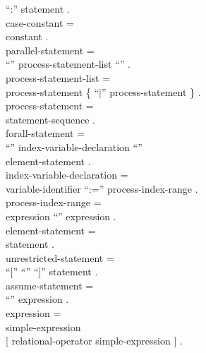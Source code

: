 \begin{grammar}
           ``:'' statement .                              \\
  {\GA}case-constant =                                    \\
    {\GB}constant .                                       \\
  {\GA}parallel-statement =                               \\
    {\GB}``{\Parallel}'' process-statement-list
           ``{\End}'' .                                   \\
  {\GA}process-statement-list =                           \\
    {\GB}process-statement
           \{ ``$|$'' process-statement \} .              \\
  {\GA}process-statement =                                \\
    {\GB}statement-sequence .                             \\
  {\GA}forall-statement =                                 \\
    {\GB}``{\Forall}'' index-variable-declaration
         ``{\Do}''                                        \\
      {\GC}element-statement .                            \\
  {\GA}index-variable-declaration =                       \\
    {\GB}variable-identifier ``:='' process-index-range . \\
  {\GA}process-index-range =                              \\
    {\GB}expression ``{\To}'' expression .                \\
  {\GA}element-statement =                                \\
    {\GB}statement .                                      \\
  {\GA}unrestricted-statement =                           \\
    {\GB}``['' ``{\Sic}'' ``]'' statement .               \\
  {\GA}assume-statement =                                 \\
    {\GB}``{\Assume}'' expression .                       \\
  {\GA}expression =                                       \\
    {\GB}simple-expression                                \\
      {\GC}[ relational-operator simple-expression ] .    \\

\end{grammar}
